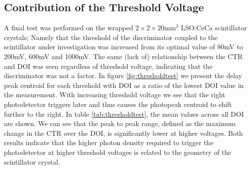 \subsection{Contribution of the Threshold Voltage}
\label{sec:threshold}
A final test was performed on the wrapped $2\times2\times20$mm$^3$ LSO:CeCa scintillator crystals; Namely that the threshold of the discriminator coupled to the scintillator under investigation was increased from its optimal value of 80mV to 200mV, 600mV and 1000mV. The same (lack of) relationship between the CTR and DOI was seen regardless of threshold voltage, indicating that the discriminator was not a factor. In figure \ref{fig:thresholdtest} we present the delay peak centroid for each threshold with DOI as a ratio of the lowest DOI value in the measurement. With increasing threshold voltage we see that the right photodetector triggers later and thus causes the photopeak centroid to shift further to the right. In table \ref{tab:thresholdtest}, the mean values across all DOI are shown. We can see that the peak to peak range, defined as the maximum change in the CTR over the DOI, is significantly lower at higher voltages. Both results indicate that the higher photon density required to trigger the photodetector at higher threshold voltages is related to the geometry of the scintillator crystal.

